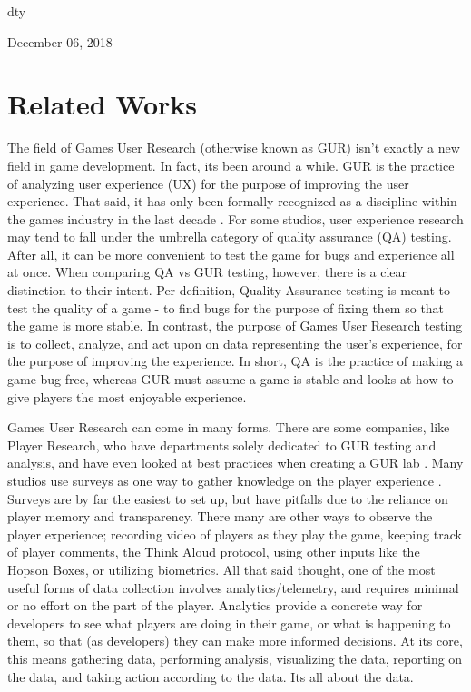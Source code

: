 \documentclass[journal]{IEEEtran}
\begin{document}
\hfill dty
 
\hfill December 06, 2018

\section{Related Works}

The field of Games User Research (otherwise known as GUR) isn’t exactly a new field in game development. In fact, its been around a while. GUR is the practice of analyzing user experience (UX) for the purpose of improving the user experience. That said, it has only been formally recognized as a discipline within the games industry in the last decade \cite{gur-ch2}. For some studios, user experience research may tend to fall under the umbrella category of quality assurance (QA) testing. After all, it can be more convenient to test the game for bugs and experience all at once. When comparing QA vs GUR testing, however, there is a clear distinction to their intent. Per definition, Quality Assurance testing is meant to test the quality of a game - to find bugs for the purpose of fixing them so that the game is more stable. In contrast, the purpose of Games User Research testing is to collect, analyze, and act upon on data representing the user’s experience, for the purpose of improving the experience. In short, QA is the practice of making a game bug free, whereas GUR must assume a game is stable and looks at how to give players the most enjoyable experience.

Games User Research can come in many forms. There are some companies, like Player Research, who have departments solely dedicated to GUR testing and analysis, and have even looked at best practices when creating a GUR lab \cite{gur-ch6}. Many studios use surveys as one way to gather knowledge on the player experience \cite{gur-ch9}. Surveys are by far the easiest to set up, but have pitfalls due to the reliance on player memory and transparency. There many are other ways to observe the player experience; recording video of players as they play the game, keeping track of player comments, the Think Aloud protocol, using other inputs like the Hopson Boxes, or utilizing biometrics. \cite{gur-ch11} \cite{gur-ch12} \cite{gur-ch16} All that said thought, one of the most useful forms of data collection involves analytics/telemetry, and requires minimal or no effort on the part of the player. \cite{gur-ch19} Analytics provide a concrete way for developers to see what players are doing in their game, or what is happening to them, so that (as developers) they can make more informed decisions. At its core, this means gathering data, performing analysis, visualizing the data, reporting on the data, and taking action according to the data. Its all about the data. \cite{gur-ch19}
\end{document}
